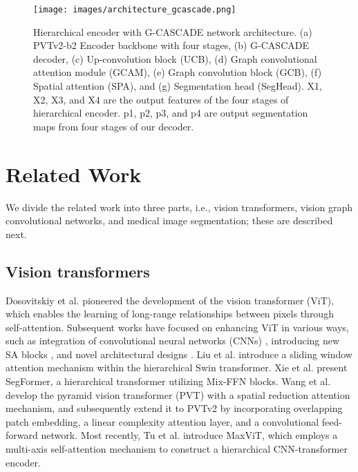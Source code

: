 \documentclass[10pt,twocolumn,letterpaper]{article}
\begin{document}
\begin{figure*}[t]
\begin{center}
\texttt{[image: images/architecture\_gcascade.png]}
\end{center}
   \caption{Hierarchical encoder with G-CASCADE network architecture. (a) PVTv2-b2 Encoder backbone with four stages, (b) G-CASCADE decoder, (c) Up-convolution block (UCB), (d) Graph convolutional attention module (GCAM), (e) Graph convolution block (GCB), (f) Spatial attention (SPA), and (g) Segmentation head (SegHead). X1, X2, X3, and X4 are the output features of the four stages of hierarchical encoder. p1, p2, p3, and p4 are output segmentation maps from four stages of our decoder.}
\label{fig:architecture}
\end{figure*}


\section{Related Work}
\label{sec:related_work}
We divide the related work into three parts, i.e., vision transformers, vision graph convolutional networks, and medical image segmentation; these are described next. 

\subsection{Vision transformers}
Dosovitskiy et al. \cite{dosovitskiy2020image} pioneered the development of the vision transformer (ViT), which enables the learning of long-range relationships between pixels through self-attention. Subsequent works have focused on enhancing ViT in various ways, such as integration of convolutional neural networks (CNNs) \cite{wang2022pvt,tu2022maxvit}, introducing new SA blocks \cite{liu2021swin,tu2022maxvit}, and novel architectural designs \cite{wang2021pyramid, xie2021segformer}. Liu et al. \cite{liu2021swin} introduce a sliding window attention mechanism within the hierarchical Swin transformer. Xie et al. \cite{xie2021segformer} present SegFormer, a hierarchical transformer utilizing Mix-FFN blocks. Wang et al. \cite{wang2021pyramid} develop the pyramid vision transformer (PVT) with a spatial reduction attention mechanism, and subsequently extend it to PVTv2 \cite{wang2022pvt} by incorporating overlapping patch embedding, a linear complexity attention layer, and a convolutional feed-forward network. Most recently, Tu et al. \cite{tu2022maxvit} introduce MaxViT, which employs a multi-axis self-attention mechanism to construct a hierarchical CNN-transformer encoder.
\end{document}
